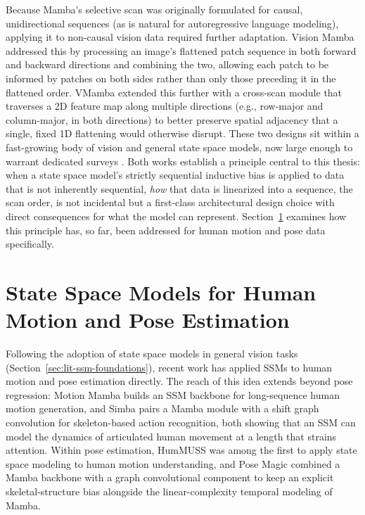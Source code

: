 Because Mamba's selective scan was originally formulated for causal,
unidirectional sequences (as is natural for autoregressive language
modeling), applying it to non-causal vision data required further
adaptation. Vision Mamba \cite{zhu2024visionmamba} addressed this by
processing an image's flattened patch sequence in both forward and
backward directions and combining the two, allowing each patch to be
informed by patches on both sides rather than only those preceding it in
the flattened order. VMamba \cite{liu2024vmamba} extended this further
with a cross-scan module that traverses a 2D feature map along multiple
directions (e.g., row-major and column-major, in both directions) to
better preserve spatial adjacency that a single, fixed 1D flattening would
otherwise disrupt. These two designs sit within a fast-growing body of
vision and general state space models, now large enough to warrant dedicated
surveys \cite{zhang2024visualmambasurvey, qu2024mambasurvey}. Both works
establish a principle central to this thesis: when a state space model's strictly sequential inductive bias is
applied to data that is not inherently sequential, \emph{how} that data is
linearized into a sequence, the scan order, is not incidental but a
first-class architectural design choice with direct consequences for what
the model can represent. Section~\ref{sec:lit-ssm-pose} examines how this
principle has, so far, been addressed for human motion and pose data
specifically.

\section{State Space Models for Human Motion and Pose Estimation}
\label{sec:lit-ssm-pose}

Following the adoption of state space models in general vision tasks
(Section~\ref{sec:lit-ssm-foundations}), recent work has applied SSMs to
human motion and pose estimation directly. The reach of this idea extends
beyond pose regression: Motion Mamba \cite{zhang2024motionmamba} builds an
SSM backbone for long-sequence human motion generation, and Simba
\cite{chaudhuri2024simba} pairs a Mamba module with a shift graph
convolution for skeleton-based action recognition, both showing that an SSM
can model the dynamics of articulated human movement at a length that strains
attention. Within pose estimation, HumMUSS \cite{mondal2024hummuss} was among
the first to apply state space modeling to human motion understanding, and
Pose Magic \cite{zhang2024posemagic} combined a Mamba backbone with a graph
convolutional component to keep an explicit skeletal-structure bias alongside
the linear-complexity temporal modeling of Mamba.

